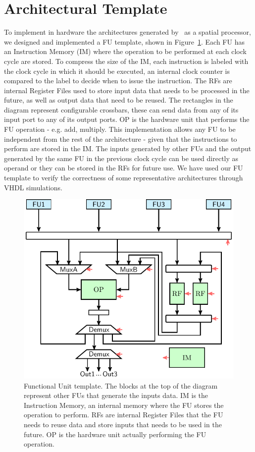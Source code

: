 \section{Architectural Template}
\label{sec:arch_template}
To implement in hardware the architectures generated by \frameworkname~as a spatial processor, we designed and implemented a FU template, shown in Figure~\ref{fig:FU_templ}. Each FU has an Instruction Memory (IM) where the operation to be performed at each clock cycle are stored. To compress the size of the IM, each instruction is labeled with the clock cycle in which it should be executed, an internal clock counter is compared to the label to decide when to issue the instruction. The RFs are internal Register Files used to store input data that needs to be processed in the future, as well as output data that need to be reused. The rectangles in the diagram represent configurable crossbars, these can send data from any of its input port to any of its output ports. OP is the hardware unit that performs the FU operation - e.g. add, multiply. This implementation allows any FU to be independent from the rest of the architecture - given that the instructions to perform are stored in the IM. The inputs generated by other FUs and the output generated by the same FU in the previous clock cycle can be used directly as operand or they can be stored in the RFs for future use. 
We have used our FU template to verify the correctness of some representative architectures through VHDL simulations.

\begin{figure}[tb] 
\centering
\includegraphics[width=.8\columnwidth]{images/functional_unit.pdf}
    \caption{\small Functional Unit template. The blocks at the top of the diagram represent other FUs that generate the inputs data. IM is the Instruction Memory, an internal memory where the FU stores the operation to perform. RFs are internal Register Files that the FU needs to reuse data and store inputs that needs to be used in the future. OP is the hardware unit actually performing the FU operation.}
\label{fig:FU_templ}
\end{figure}
